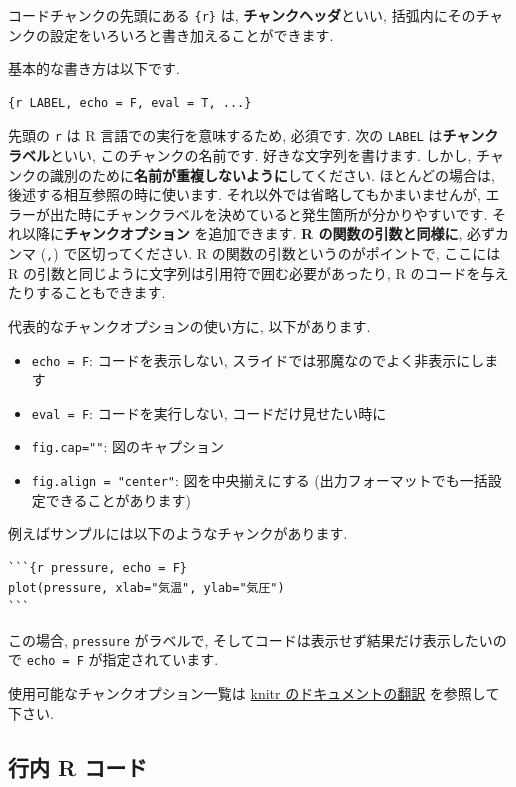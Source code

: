 \documentclass[
]{ltjsarticle}
\providecommand{\tightlist}{%
  \setlength{\itemsep}{0pt}\setlength{\parskip}{0pt}}
\begin{document}
コードチャンクの先頭にある \texttt{\{r\}} は, \textbf{チャンクヘッダ}といい, 括弧内にそのチャンクの設定をいろいろと書き加えることができます.

基本的な書き方は以下です.

\begin{verbatim}
{r LABEL, echo = F, eval = T, ...}
\end{verbatim}

先頭の \texttt{r} は R 言語での実行を意味するため, 必須です. 次の \texttt{LABEL} は\textbf{チャンクラベル}といい, このチャンクの名前です. 好きな文字列を書けます. しかし, チャンクの識別のために\textbf{名前が重複しないように}してください. ほとんどの場合は, 後述する相互参照の時に使います. それ以外では省略してもかまいませんが, エラーが出た時にチャンクラベルを決めていると発生箇所が分かりやすいです. それ以降に\textbf{チャンクオプション} を追加できます. \textbf{R の関数の引数と同様に}, 必ずカンマ (\texttt{,}) で区切ってください. R の関数の引数というのがポイントで, ここには R の引数と同じように文字列は引用符で囲む必要があったり, R のコードを与えたりすることもできます.

代表的なチャンクオプションの使い方に, 以下があります.

\begin{itemize}
\tightlist
\item
  \texttt{echo\ =\ F}: コードを表示しない, スライドでは邪魔なのでよく非表示にします
\item
  \texttt{eval\ =\ F}: コードを実行しない, コードだけ見せたい時に
\item
  \texttt{fig.cap=""}: 図のキャプション
\item
  \texttt{fig.align\ =\ "center"}: 図を中央揃えにする (出力フォーマットでも一括設定できることがあります)
\end{itemize}

例えばサンプルには以下のようなチャンクがあります.

\begin{verbatim}
```{r pressure, echo = F}
plot(pressure, xlab="気温", ylab="気圧")
```
\end{verbatim}

この場合, \texttt{pressure} がラベルで, そしてコードは表示せず結果だけ表示したいので \texttt{echo\ =\ F} が指定されています.

使用可能なチャンクオプション一覧は \href{https://gedevan-aleksizde.github.io/knitr-doc-ja/index.html}{knitr のドキュメントの翻訳} を参照して下さい.

\hypertarget{ux884cux5185-r-ux30b3ux30fcux30c9}{%
\subsection{行内 R コード}\label{ux884cux5185-r-ux30b3ux30fcux30c9}}
\end{document}
